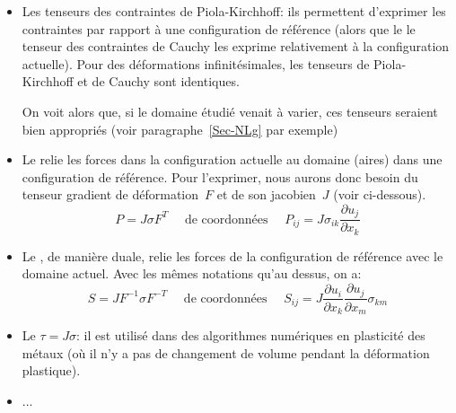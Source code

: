 \begin{itemize}
  \item Les tenseurs des contraintes de Piola-Kirchhoff:
	ils permettent d'exprimer les contraintes par rapport à une configuration de référence
	(alors que le le tenseur des contraintes de Cauchy les exprime relativement à la configuration
	actuelle).
	Pour des déformations infinitésimales, les tenseurs de Piola-Kirchhoff et de Cauchy sont
	identiques.

	On voit alors que, si le domaine étudié venait à varier, ces tenseurs seraient bien
	appropriés (voir paragraphe~\ref{Sec-NLg} par exemple)

  \item Le 
	relie les forces dans la configuration actuelle au domaine (aires) dans une
	configuration de référence.
	Pour l'exprimer, nous aurons donc besoin du tenseur gradient de déformation~$F$ et de son
	jacobien~$J$ (voir ci-dessous).
	\begin{equation}P=J\sigma F^T \quad \text{ de coordonnées } \quad
	P_{ij}= J \sigma_{ik}\frac{\partial u_j}{\partial x_k}\end{equation}

  \item Le ,
	de manière duale, relie les forces de la configuration de référence avec le domaine actuel.
	Avec les mêmes notations qu'au dessus, on a:
	\begin{equation} S=J F^{-1}\sigma F^{-T} \quad \text{ de coordonnées } \quad
	S_{ij} = J \frac{\partial u_i}{\partial x_k}\frac{\partial u_j}{\partial x_m}\sigma_{km}\end{equation}

  \item Le 
	$\tau = J\sigma$: il est utilisé dans des 	algorithmes numériques en plasticité des métaux
	(où il n'y a pas de changement de volume pendant la déformation plastique).

  \item ...
\end{itemize}
